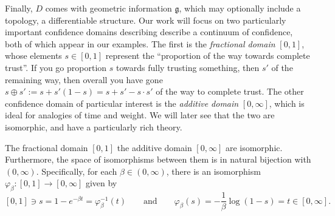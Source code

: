 Finally, $D$ comes with geometric information $\mathfrak g$, which may 
	optionally include a topology, a differentiable structure.
Our work will focus on two
 	particularly important confidence domains 
		describing describe a continuum of confidence,
		both of which appear in our examples.
The first is the \emph{fractional domain} $[0,1]$,
whose elements $s \in [0,1]$ represent 
	the ``proportion of the way towards complete trust''.
If you go proportion $s$ towards fully trusting something,
then $s'$ of the remaining way, then overall
you have gone
$s \oplus s'
:= s + s' (1-s) = 
s + s' - s \cdot s'$
    of the way to complete trust.
The other confidence domain of particular interest
 	is the \emph{additive domain} $[0,\infty]$, which is
	ideal for analogies of time and weight.
We will later see that the two are isomorphic,
	and have a particularly rich theory.
	
\begin{prop}
	The fractional domain $[0,1]$ the additive domain $[0,\infty]$ are isomorphic.
	Furthermore, the space of isomorphisms between them 
		is
		in natural bijection with $(0,\infty)$.
	Specifically, for each $\beta \in (0,\infty)$, there is
		an isomorphism $\varphi_\beta : [0,1] \to [0,\infty]$ given by
	\[
		[0,1] \ni s = 1-e^{-\beta t} = \varphi_\beta^{-1}(t)
			\qquad\text{and}\qquad
			 \varphi_\beta(s) = -\frac1\beta \log(1-s) = t \in [0,\infty]
			 .
	\]
\end{prop}

